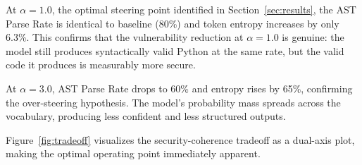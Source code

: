 \documentclass[journal, onecolumn]{IEEEtran}
\begin{document}
At $\alpha = 1.0$, the optimal steering point identified in Section~\ref{sec:results}, the AST Parse Rate is identical to baseline (80\%) and token entropy increases by only 6.3\%. This confirms that the vulnerability reduction at $\alpha = 1.0$ is genuine: the model still produces syntactically valid Python at the same rate, but the valid code it produces is measurably more secure.

At $\alpha = 3.0$, AST Parse Rate drops to 60\% and entropy rises by 65\%, confirming the over-steering hypothesis. The model's probability mass spreads across the vocabulary, producing less confident and less structured outputs.

Figure~\ref{fig:tradeoff} visualizes the security-coherence tradeoff as a dual-axis plot, making the optimal operating point immediately apparent.
\end{document}
